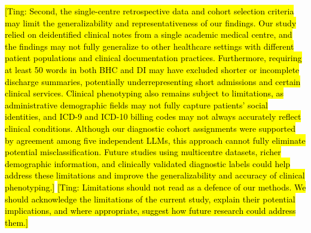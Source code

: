 \documentclass[unnumsec,webpdf,contemporary,large]{oup-authoring-template}
\newcommand{\td}[1]{\sethlcolor{pink}\hl{[Ting: #1]}}
\begin{document}
\td{Second, the single-centre retrospective data and cohort selection criteria may limit the generalizability and representativeness of our findings. Our study relied on deidentified clinical notes from a single academic medical centre, and the findings may not fully generalize to other healthcare settings with different patient populations and clinical documentation practices. Furthermore, requiring at least 50 words in both BHC and DI may have excluded shorter or incomplete discharge summaries, potentially underrepresenting short admissions and certain clinical services. Clinical phenotyping also remains subject to limitations, as administrative demographic fields may not fully capture patients' social identities, and ICD-9 and ICD-10 billing codes may not always accurately reflect clinical conditions. Although our diagnostic cohort assignments were supported by agreement among five independent LLMs, this approach cannot fully eliminate potential misclassification. Future studies using multicentre datasets, richer demographic information, and clinically validated diagnostic labels could help address these limitations and improve the generalizability and accuracy of clinical phenotyping.}
\td{Limitations should not read as a defence of our methods. We should acknowledge the limitations of the current study, explain their potential implications, and where appropriate, suggest how future research could address them.}
\end{document}
